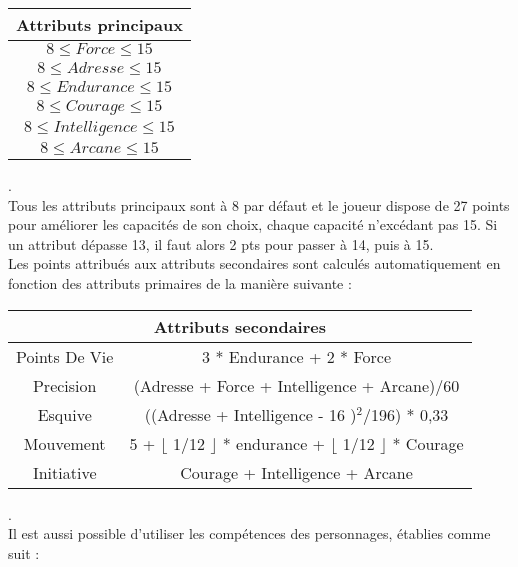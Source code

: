 \documentclass[a4paper,12pt]{report}
\begin{document}
	\begin{center}
		\begin{tabular}{|c|}
			
			\hline
			Attributs principaux \\
			\hline
			$8 \le Force \le 15$ \\
			\hline
			$8 \le Adresse \le 15$ \\
			\hline
			$8 \le Endurance \le 15$ \\
			\hline
			$8 \le Courage \le 15$ \\
			\hline
			$8 \le Intelligence \le 15$ \\
			\hline
			$8 \le Arcane \le 15$ \\
			\hline
			
		\end{tabular}
	\end{center}
	. \\ 
	Tous les attributs principaux sont à 8 par défaut et le joueur dispose de 27 points pour améliorer les capacités de son choix, chaque capacité n'excédant pas 15. Si un attribut dépasse 13, il faut alors 2 pts pour passer à 14, puis à 15. \\
	
	Les points attribués aux attributs secondaires sont calculés automatiquement en fonction des attributs primaires de la manière suivante : \\
	
	\begin{tabular}{|c|c|}
		\hline
		\multicolumn{2}{|c|}{\textbf{Attributs secondaires}} \\
		\hline
		Points De Vie & 3 * Endurance + 2 * Force \\
		\hline
		Precision & (Adresse + Force + Intelligence + Arcane)/60 \\
		\hline
		Esquive & ((Adresse + Intelligence - 16 )$^2$/196) * 0,33 \\
		\hline
		Mouvement & 5 + $\lfloor$ 1/12 $\rfloor$ * endurance + $\lfloor$ 1/12 $\rfloor$ * Courage \\
		\hline
		Initiative & Courage + Intelligence + Arcane \\
		\hline
	\end{tabular}
	
	.\\ 
	
	
	Il est aussi possible d'utiliser les compétences des personnages, établies comme suit : \\ 
\end{document}
